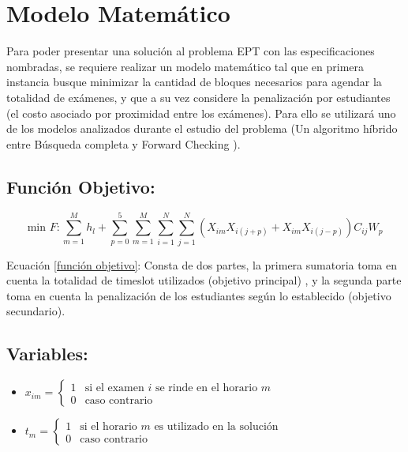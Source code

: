 \documentclass[letter, 10pt]{article}
\begin{document}
\section{Modelo Matem\'atico}
\label{Modelo}
Para poder presentar una solución al problema EPT con las especificaciones nombradas, se requiere realizar un modelo matemático tal que en primera instancia busque minimizar la cantidad de bloques necesarios para agendar la totalidad de exámenes, y que a su vez considere la penalización por estudiantes (el costo asociado por proximidad entre los exámenes). Para ello se utilizará uno de los modelos analizados durante el estudio del problema (Un algoritmo híbrido entre Búsqueda completa y Forward Checking \cite{Cita24}).

\subsection{Función Objetivo:}
\begin{equation}
    \label{función objetivo}
    \text{min } F: \sum_{m=1}^M h_l + \sum_{p=0}^5 \sum_{m=1}^M \sum_{i=1}^N \sum_{j=1}^N (X_{im}X_{i(j+p)}+X_{im}X_{i(j-p)})C_{ij}W_{p}
\end{equation}
\begin{center}
    Ecuación \ref{función objetivo}: Consta de dos partes, la primera sumatoria toma en cuenta la totalidad de timeslot utilizados (objetivo principal) , y la segunda parte toma en cuenta la penalización de los estudiantes según lo establecido (objetivo secundario).
\end{center}

\subsection{Variables:}
\begin{center}
\begin{itemize}
	\item $x_{im} =
					\left\{
						\begin{array}{ll}
							1  & \mbox{si el examen } i \text{ se rinde en el horario } m \\
							0 & \mbox{caso contrario}
						\end{array}
					\right.$
	\item $t_{m} =
					\left\{
						\begin{array}{ll}
							1  & \mbox{si el horario } m \text{ es utilizado en la solución}\\
							0 & \mbox{caso contrario}
						\end{array}
					\right.$

\end{itemize}

\end{center}
\end{document}
